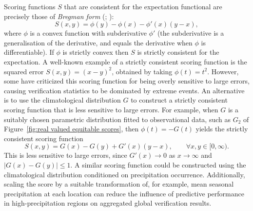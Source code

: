 \documentclass[10pt]{article} %
\theoremstyle{theorem}
\theoremstyle{definition}
\begin{document}
Scoring functions $S$ that are consistent for the expectation functional are precisely those of \textit{Bregman form} (\citealt{savage1971elicitation}; \citealt[Theorem~7]{gneiting2011making}):
\begin{equation}\label{eq:bregman}
S(x,y) = \phi(y) - \phi(x) - \phi'(x)(y-x),
\end{equation}
where $\phi$ is a convex function with subderivative $\phi'$ (the subderivative is a generalisation of the derivative, and equals the derivative when $\phi$ is differentiable). If $\phi$ is strictly convex then $S$ is strictly consistent for the expectation. A well-known example of a strictly consistent scoring function is the squared error $S(x,y)=(x-y)^2$, obtained by taking $\phi(t)=t^2$. However, some have criticized this scoring function for being overly sensitive to large errors, causing verification statistics to be dominated by extreme events. An alternative is to use the climatological distribution $G$ to construct a strictly consistent scoring function that is less sensitive to large errors. For example, when $G$ is a suitably chosen parametric distribution fitted to observational data, such as $G_2$ of Figure~\ref{fig:real valued equitable scores}, then $\phi(t)=-G(t)$ yields the strictly consistent scoring function
\begin{equation}\label{eq:bregman using climate}
S(x,y)=G(x)-G(y)+G'(x)(y-x), \qquad\forall x,y\in[0,\infty).
\end{equation}
This is less sensitive to large errors, since $G'(x)\to 0$ as $x\to\infty$ and $|G(x)-G(y)|\leq 1$. A similar scoring function could be constructed using the climatological distribution conditioned on precipitation occurrence. Additionally, scaling the score by a suitable transformation of, for example, mean seasonal precipitation at each location can reduce the influence of predictive performance in high-precipitation regions on aggregated global verification results.
\end{document}
